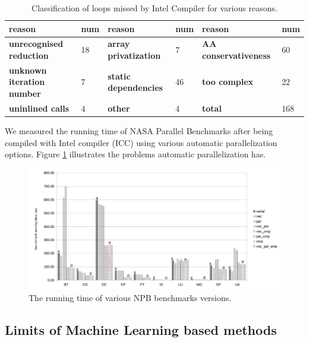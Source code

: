 \begin{table}
  \begin{minipage}{\pagewidth}
  \begin{center}
    \begin{tabu}{M{3.0cm}M{1.0cm}M{3.0cm}M{1.0cm}M{3.0cm}M{1.0cm}}
      \hline
      \rowfont{\bfseries}
      reason & num & reason & num & reason & num\\\hline
      \textbf{unrecognised reduction} & 18 & \textbf{array privatization} & 7 & \textbf{AA conservativeness} & 60\\\hline
      \textbf{unknown iteration number} & 7 & \textbf{static dependencies} & 46 & \textbf{too complex} & 22\\\hline
      \textbf{uninlined calls} & 4 & \textbf{other} & 4 & \textbf{total} & 168\\\hline
    \end{tabu}
  \end{center}
  \end{minipage}
  \caption{Classification of loops missed by Intel Compiler for various reasons.}
  \label{tab:icc_missed_opportunities}
\end{table}%

We measured the running time of NASA Parallel Benchmarks after being compiled with Intel compiler (ICC) using various automatic parallelization options. Figure \ref{fig:benchmarks_runtime} illustrates the problems automatic parallelization has.

\begin{figure}[ht]
\includegraphics[width=1.0\textwidth]{images/benchmark_runtime.pdf}
\caption{The running time of various NPB benchmarks versions.}
\label{fig:benchmarks_runtime}
\end{figure}

\subsection{Limits of Machine Learning based methods}
\label{background_challenges_ml}

